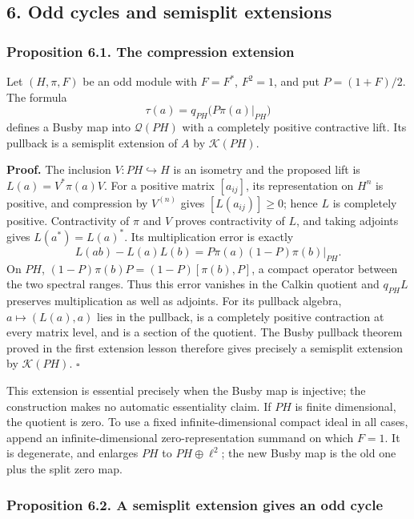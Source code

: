 \documentclass[
  11pt,
]{article}
\begin{document}
\subsection{6. Odd cycles and semisplit
extensions}\label{odd-cycles-and-semisplit-extensions}

\subsubsection{Proposition 6.1. The compression
extension}\label{proposition-6.1.-the-compression-extension}

Let \((H,\pi,F)\) be an odd module with \(F=F^*\), \(F^2=1\), and put
\(P=(1+F)/2\). The formula \[
\tau(a)=q_{PH}\big(P\pi(a)|_{PH}\big)
\tag{6.1}
\] defines a Busby map into \(\mathcal Q(PH)\) with a completely
positive contractive lift. Its pullback is a semisplit extension of
\(A\) by \(\mathcal K(PH)\).

\textbf{Proof.} The inclusion \(V:PH\hookrightarrow H\) is an isometry
and the proposed lift is \(L(a)=V^*\pi(a)V\). For a positive matrix
\([a_{ij}]\), its representation on \(H^n\) is positive, and compression
by \(V^{(n)}\) gives \([L(a_{ij})]\geq0\); hence \(L\) is completely
positive. Contractivity of \(\pi\) and \(V\) proves contractivity of
\(L\), and taking adjoints gives \(L(a^*)=L(a)^*\). Its multiplication
error is exactly \[
L(ab)-L(a)L(b)
=P\pi(a)(1-P)\pi(b)|_{PH}.
\tag{6.2}
\] On \(PH\), \((1-P)\pi(b)P=(1-P)[\pi(b),P]\), a compact operator
between the two spectral ranges. Thus this error vanishes in the Calkin
quotient and \(q_{PH}L\) preserves multiplication as well as adjoints.
For its pullback algebra, \(a\mapsto(L(a),a)\) lies in the pullback, is
a completely positive contraction at every matrix level, and is a
section of the quotient. The Busby pullback theorem proved in the first
extension lesson therefore gives precisely a semisplit extension by
\(\mathcal K(PH)\). \(\square\)

This extension is essential precisely when the Busby map is injective;
the construction makes no automatic essentiality claim. If \(PH\) is
finite dimensional, the quotient is zero. To use a fixed
infinite-dimensional compact ideal in all cases, append an
infinite-dimensional zero-representation summand on which \(F=1\). It is
degenerate, and enlarges \(PH\) to \(PH\oplus\ell^2\); the new Busby map
is the old one plus the split zero map.

\subsubsection{Proposition 6.2. A semisplit extension gives an odd
cycle}\label{proposition-6.2.-a-semisplit-extension-gives-an-odd-cycle}
\end{document}
